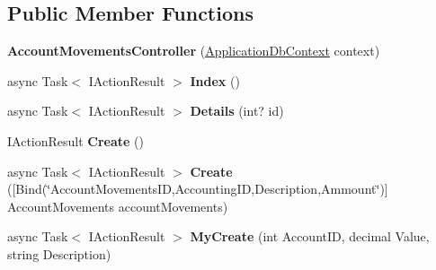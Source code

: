 \subsection*{Public Member Functions}
\begin{DoxyCompactItemize}
\item 
\mbox{\label{class_projeto_e_s_w_1_1_controllers_1_1_account_movements_controller_ab6fa0a39654737364973c38c42df49d0}} 
{\bfseries Account\+Movements\+Controller} (\mbox{\hyperlink{class_projeto_e_s_w_1_1_data_1_1_application_db_context}{Application\+Db\+Context}} context)
\item 
\mbox{\label{class_projeto_e_s_w_1_1_controllers_1_1_account_movements_controller_a755ffccaeec35455a2fe1cf53b415319}} 
async Task$<$ I\+Action\+Result $>$ {\bfseries Index} ()
\item 
\mbox{\label{class_projeto_e_s_w_1_1_controllers_1_1_account_movements_controller_a354648b984d5b64dc14ca4b698c6f593}} 
async Task$<$ I\+Action\+Result $>$ {\bfseries Details} (int? id)
\item 
\mbox{\label{class_projeto_e_s_w_1_1_controllers_1_1_account_movements_controller_a4f73ca2229fb3716cc514b0eaf1eef4a}} 
I\+Action\+Result {\bfseries Create} ()
\item 
\mbox{\label{class_projeto_e_s_w_1_1_controllers_1_1_account_movements_controller_ab3e8c7543e8746dadfc4b518d92b66ac}} 
async Task$<$ I\+Action\+Result $>$ {\bfseries Create} (\mbox{[}Bind(\char`\"{}Account\+Movements\+ID,Accounting\+ID,Description,Ammount\char`\"{})\mbox{]} Account\+Movements account\+Movements)
\item 
\mbox{\label{class_projeto_e_s_w_1_1_controllers_1_1_account_movements_controller_a3686b0c486e413651124abfb43cc0916}} 
async Task$<$ I\+Action\+Result $>$ {\bfseries My\+Create} (int Account\+ID, decimal Value, string Description)
\item 

\end{DoxyCompactItemize}
